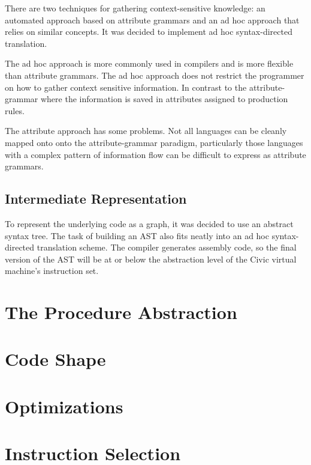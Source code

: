 \documentclass[12pt]{article}
\begin{document}
There are two techniques for gathering context-sensitive knowledge: an automated approach based on attribute grammars \cite{paakki1995attribute} and an ad hoc approach that relies on similar concepts. It was decided to implement ad hoc syntax-directed translation.

The ad hoc approach is more commonly used in compilers and is more flexible than attribute grammars. The ad hoc approach does not restrict the programmer on how to gather context sensitive information. In contrast to the attribute-grammar where the information is saved in attributes assigned to production rules.

The attribute approach has some problems. Not all languages can be cleanly mapped onto onto the attribute-grammar paradigm, particularly those languages with a complex pattern of information flow can be difficult to express as attribute grammars.

\subsection{Intermediate Representation}


To represent the underlying code as a graph, it was decided to use an abstract syntax tree. The task of building an AST also fits neatly into an ad hoc syntax-directed translation scheme. The compiler generates assembly code, so the final version of the AST will be at or below the abstraction level of the Civic virtual machine's instruction set.

\section{The Procedure Abstraction}

\section{Code Shape}

\section{Optimizations}

\section{Instruction Selection}

\newpage



\end{document}
